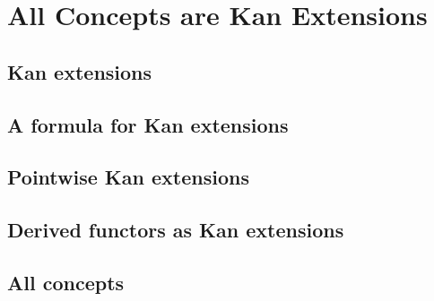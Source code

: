 \documentclass[../solutions]{subfiles}
\begin{document}
\chapter{All Concepts are Kan Extensions}
\section{Kan extensions}




\pagebreak
\section{A formula for Kan extensions}



\pagebreak
\section{Pointwise Kan extensions}



\pagebreak
\section{Derived functors as Kan extensions}





\pagebreak
\section{All concepts}







\end{document}

